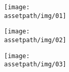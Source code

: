 \hfill
\begin{figure}[b!]
\vspace{-3em}
    \begin{subfigure}[b]{0.3\textwidth}
        \texttt{[image: \\assetpath/img/01]}
        \vspace{-1em}
    \end{subfigure}
    \hfill
    \begin{subfigure}[b]{0.3\textwidth}
        \texttt{[image: \\assetpath/img/02]}
        \vspace{-1em}
    \end{subfigure}
    \hfill
     \begin{subfigure}[b]{0.3\textwidth}
         \texttt{[image: \\assetpath/img/03]}
         \vspace{-1em}
     \end{subfigure}
\end{figure}
